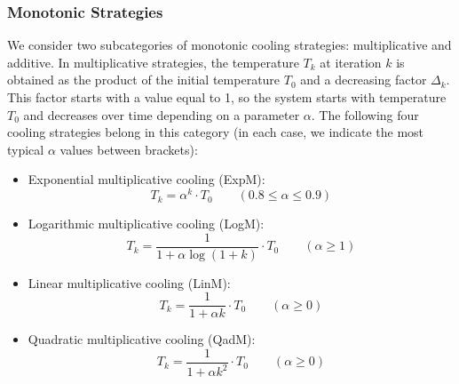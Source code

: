 \documentclass[icae]{iosart2x}
\newcommand{\reviewed}[1]{#1} %
\begin{document}
\subsubsection{Monotonic Strategies}\label{subsec:monotonic}
We consider two \reviewed{subcategories} of monotonic cooling strategies: multiplicative and additive. In multiplicative strategies, the temperature ${T_k}$ at iteration $k$ is obtained as the product of the initial temperature $T_0$ \reviewed{and} a decreasing factor $\Delta_k$. \reviewed{This} factor starts with a value equal to 1, so the system starts with temperature $T_0$ \reviewed{and decreases over time depending on a parameter $\alpha$.} \reviewed{The following four cooling strategies belong in this category (in each case, we indicate the most typical $\alpha$ values between brackets):}
\begin{itemize}
\item Exponential multiplicative cooling (ExpM):
\begin{equation}
T_{k} = \alpha^{k} \cdot T_{0}  \qquad (0.8 \leq \alpha \leq 0.9)
\end{equation}
\item Logarithmic multiplicative cooling (LogM):
\begin{equation}
T_{k} =  \frac{1}{1+ \alpha \log(1+k)} \cdot T_{0} \qquad (\alpha \geq 1)
\end{equation}
\item Linear multiplicative cooling (LinM):
\begin{equation}
T_{k} =  \frac{1}{1+ \alpha k} \cdot T_{0} \qquad (\alpha \geq 0)
\end{equation}
\item Quadratic multiplicative cooling (QadM):
\begin{equation}
T_{k} =  \frac{1}{1+ \alpha k^2} \cdot T_{0} \qquad (\alpha \geq 0)
\end{equation}
\end{itemize}
\end{document}

